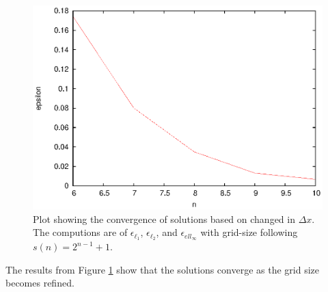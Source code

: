  
  \begin{figure}
    \centering
    \includegraphics{converge_spatial}
    \caption{Plot showing the convergence of solutions based on changed in $\Delta x$. The computions are of $\epsilon_{\ell_1}$, $\epsilon_{\ell_2}$, and $\epsilon_{ell_\infty}$ with grid-size following $s(n) = 2^{n-1}+1$.}
    \label{fig:converge_spatial}
  \end{figure}

  The results from Figure \ref{fig:converge_spatial} show that the solutions converge as the grid size becomes refined.


%
%
%
 

